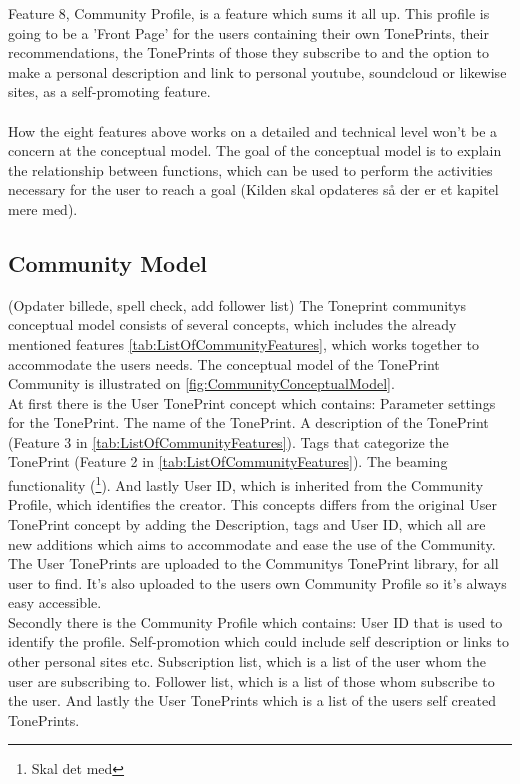 Feature 8, Community Profile, is a feature which sums it all up. This profile is going to be a 'Front Page' for the users containing their own TonePrints, their recommendations, the TonePrints of those they subscribe to and the option to make a personal description and link to personal youtube, soundcloud or likewise sites, as a self-promoting feature.\\
\\
How the eight features above works on a detailed and technical level won't be a concern at the conceptual model. The goal of the conceptual model is to explain the relationship between functions, which can be used to perform the activities necessary for the user to reach a goal \parencite{Henderson2012}(Kilden skal opdateres så der er et kapitel mere med).


\subsection{Community Model}
\label{CommunityModel}
(Opdater billede, spell check, add follower list)
The Toneprint communitys conceptual model consists of several concepts, which includes the already mentioned features \autoref{tab:ListOfCommunityFeatures}, which works together to accommodate the users needs. The conceptual model of the TonePrint Community is illustrated on \autoref{fig:CommunityConceptualModel}.\\
At first there is the User TonePrint concept which contains: Parameter settings for the TonePrint. The name of the TonePrint. A description of the TonePrint (Feature 3 in \autoref{tab:ListOfCommunityFeatures}). Tags that categorize the TonePrint (Feature 2 in \autoref{tab:ListOfCommunityFeatures}). The beaming functionality (\footnote{Skal det med}). And lastly User ID, which is inherited from the Community Profile, which identifies the creator. This concepts differs from the original User TonePrint concept by adding the Description, tags and User ID, which all are new additions which aims to accommodate and ease the use of the Community. The User TonePrints are uploaded to the Communitys TonePrint library, for all user to find. It's also uploaded to the users own Community Profile so it's always easy accessible.\\
Secondly there is the Community Profile which contains: User ID that is used to identify the profile. Self-promotion which could include self description or links to other personal sites etc. Subscription list, which is a list of the user whom the user are subscribing to. Follower list, which is a list of those whom subscribe to the user. And lastly the User TonePrints which is a list of the users self created TonePrints. 

